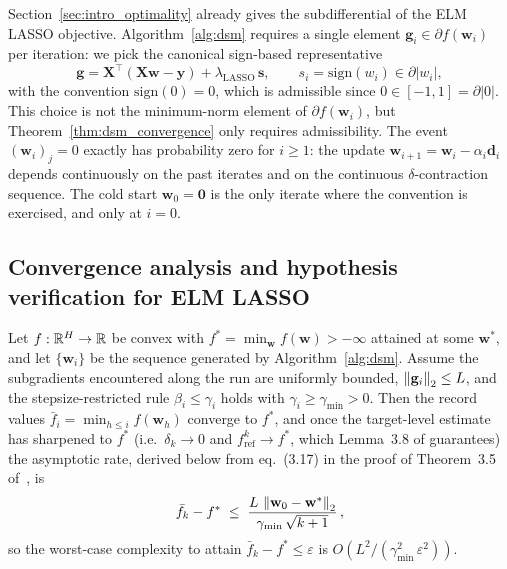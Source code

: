 Section~\ref{sec:intro_optimality} already gives the subdifferential of the ELM LASSO objective. Algorithm~\ref{alg:dsm} requires a single element $\mathbf{g}_i \in \partial f(\mathbf{w}_i)$ per iteration: we pick the canonical sign-based representative
\begin{equation}\label{eq:dsm_subgrad}
  \mathbf{g} = \mathbf{X}^\top(\mathbf{X}\mathbf{w} - \mathbf{y}) + \lambda_{\text{LASSO}}\, \mathbf{s},
  \qquad s_i = \mathrm{sign}(w_i) \in \partial|w_i|,
\end{equation}
with the convention $\mathrm{sign}(0) = 0$, which is admissible since $0 \in [-1,1] = \partial|0|$. This choice is not the minimum-norm element of $\partial f(\mathbf{w}_i)$, but Theorem~\ref{thm:dsm_convergence} only requires admissibility. The event $(\mathbf{w}_i)_j = 0$ exactly has probability zero for $i \ge 1$: the update $\mathbf{w}_{i+1} = \mathbf{w}_i - \alpha_i \mathbf{d}_i$ depends continuously on the past iterates and on the continuous $\delta$-contraction sequence. The cold start $\mathbf{w}_0 = \mathbf{0}$ is the only iterate where the convention is exercised, and only at $i = 0$.

\subsection{Convergence analysis and hypothesis verification for ELM LASSO}
\label{sec:dsm_convergence}

\begin{theorem}
\label{thm:dsm_convergence}
Let $f : \mathbb{R}^H \to \mathbb{R}$ be convex with $f^* = \min_{\mathbf{w}} f(\mathbf{w}) > -\infty$ attained at some $\mathbf{w}^*$, and let $\{\mathbf{w}_i\}$ be the sequence generated by Algorithm~\ref{alg:dsm}. Assume the subgradients encountered along the run are uniformly bounded, $\left\lVert \mathbf{g}_i \right\rVert_2 \leq L$, and the stepsize-restricted rule $\beta_i \le \gamma_i$ holds with $\gamma_i \ge \gamma_{\min} > 0$. Then the record values $\bar{f}_i = \min_{h \le i} f(\mathbf{w}_h)$ converge to $f^*$, and once the target-level estimate has sharpened to $f^*$ (i.e.\ $\delta_k \to 0$ and $f^k_{\mathrm{ref}} \to f^*$, which Lemma~3.8 of \cite{dantonio2009deflected} guarantees) the asymptotic rate, derived below from eq.~(3.17) in the proof of Theorem~3.5 of~\cite{dantonio2009deflected}, is
\begin{equation}
\label{eq:def-rate-deflected}
\bar{f}_k - f^* \;\leq\; \frac{L\,\left\lVert \mathbf{w}_0 - \mathbf{w}^* \right\rVert_2}{\gamma_{\min}\,\sqrt{k+1}}\,,
\end{equation}
so the worst-case complexity to attain $\bar f_k - f^* \le \varepsilon$ is $O\!\left(L^2/(\gamma_{\min}^{2}\,\varepsilon^2)\right)$.
\end{theorem}


